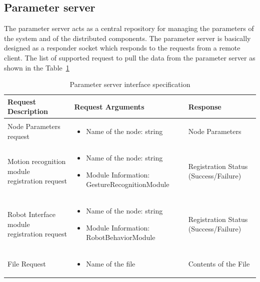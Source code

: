 \subsection*{Parameter server} 
The parameter server acts as a central repository for managing the parameters of the system and of the distributed components. The parameter server is basically designed as a responder socket which responds to the requests from a remote client. The list of supported request to pull the data from the parameter server as shown in the Table~\ref{table:parameter_server}
\begin{table}[H]
\centering
\small
\caption{Parameter server interface specification}
\label{table:parameter_server}
\begin{tabular}{| p{3.1cm} | p{7.4cm} | p{2.8cm} |}
\hline
  \textbf{Request Description} & \textbf{Request Arguments} & \textbf{Response}
  \tabularnewline \hline
  Node Parameters request & \begin{itemize}[leftmargin=*,topsep={0pt},itemsep={0pt},partopsep={0pt},parsep={0pt}] 
                                                  \item Name of the node: string
                                                  \end{itemize} & Node Parameters 
                                          \tabularnewline\hline
                                          
  Motion recognition module registration request &  \begin{itemize}[leftmargin=*,topsep={0pt},itemsep={0pt},partopsep={0pt},parsep={0pt}] 
                                                  \item Name of the node: string
                                                  \item Module Information: GestureRecognitionModule
                                                \end{itemize} & Registration Status  (Success/Failure)
                                          \tabularnewline\hline
  
  Robot Interface module registration request & \begin{itemize}[leftmargin=*,topsep={0pt},itemsep={0pt},partopsep={0pt},parsep={0pt}] 
                                                \item Name of the node: string
                                                \item Module Information: RobotBehaviorModule 
                                            \end{itemize} & Registration Status  (Success/Failure)
                                          \tabularnewline\hline
  File Request & \begin{itemize}[leftmargin=*,topsep={0pt},itemsep={0pt},partopsep={0pt},parsep={0pt}] 
                                                  \item Name of the file
                                                  \end{itemize} & Contents of the File  
  										 \tabularnewline\hline
\end{tabular}
\end{table}
